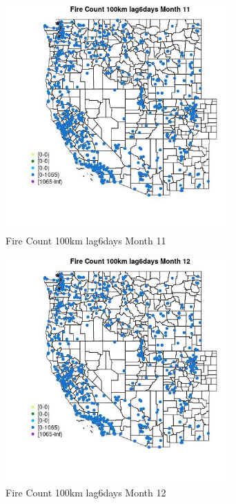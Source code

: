 \begin{figure} 
\centering  
\includegraphics[width=0.77\textwidth]{Code_Outputs/Report_ML_input_PM25_Step4_part_f_de_duplicated_aveswNAs_MapObsMo11Fire_Count_100km_lag6days.jpg} 
\caption{\label{fig:Report_ML_input_PM25_Step4_part_f_de_duplicated_aveswNAsMapObsMo11Fire_Count_100km_lag6days}Fire Count 100km lag6days Month 11} 
\end{figure} 
 

\begin{figure} 
\centering  
\includegraphics[width=0.77\textwidth]{Code_Outputs/Report_ML_input_PM25_Step4_part_f_de_duplicated_aveswNAs_MapObsMo12Fire_Count_100km_lag6days.jpg} 
\caption{\label{fig:Report_ML_input_PM25_Step4_part_f_de_duplicated_aveswNAsMapObsMo12Fire_Count_100km_lag6days}Fire Count 100km lag6days Month 12} 
\end{figure} 
 

